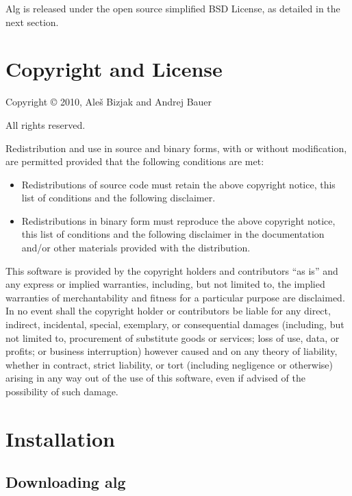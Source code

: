 \documentclass{article}
\begin{document}
Alg is released under the open source simplified BSD License, as
detailed in the next section.

\section{Copyright and License}
\label{sec:copyr-license}

\noindent
Copyright {\copyright} 2010, Ale\v{s} Bizjak and Andrej Bauer

\bigskip

\noindent
All rights reserved.

\bigskip

\noindent
Redistribution and use in source and binary forms, with or without
modification, are permitted provided that the following conditions are
met:
%
\begin{itemize}
\item Redistributions of source code must retain the above copyright
  notice, this list of conditions and the following disclaimer.
\item Redistributions in binary form must reproduce the above
  copyright notice, this list of conditions and the following
  disclaimer in the documentation and/or other materials provided with
  the distribution.
\end{itemize}

This software is provided by the copyright holders and contributors
``as is'' and any express or implied warranties, including, but not
limited to, the implied warranties of merchantability and fitness for
a particular purpose are disclaimed. In no event shall the copyright
holder or contributors be liable for any direct, indirect, incidental,
special, exemplary, or consequential damages (including, but not
limited to, procurement of substitute goods or services; loss of use,
data, or profits; or business interruption) however caused and on any
theory of liability, whether in contract, strict liability, or tort
(including negligence or otherwise) arising in any way out of the use
of this software, even if advised of the possibility of such damage.

\section{Installation}
\label{sec:installation}

\subsection{Downloading alg}
\label{sec:how-obtain-alg}
\end{document}
